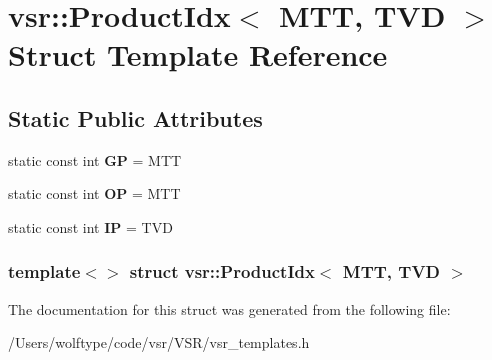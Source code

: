 \hypertarget{structvsr_1_1_product_idx_3_01_m_t_t_00_01_t_v_d_01_4}{\section{vsr\-:\-:Product\-Idx$<$ M\-T\-T, T\-V\-D $>$ Struct Template Reference}
\label{structvsr_1_1_product_idx_3_01_m_t_t_00_01_t_v_d_01_4}
}
\subsection*{Static Public Attributes}
\begin{DoxyCompactItemize}
\item 
\hypertarget{structvsr_1_1_product_idx_3_01_m_t_t_00_01_t_v_d_01_4_af16777eadacdc41477fe3db12b7c80a8}{static const int {\bfseries G\-P} = M\-T\-T}\label{structvsr_1_1_product_idx_3_01_m_t_t_00_01_t_v_d_01_4_af16777eadacdc41477fe3db12b7c80a8}

\item 
\hypertarget{structvsr_1_1_product_idx_3_01_m_t_t_00_01_t_v_d_01_4_a8c6edd445468ea415e7f46837b878c74}{static const int {\bfseries O\-P} = M\-T\-T}\label{structvsr_1_1_product_idx_3_01_m_t_t_00_01_t_v_d_01_4_a8c6edd445468ea415e7f46837b878c74}

\item 
\hypertarget{structvsr_1_1_product_idx_3_01_m_t_t_00_01_t_v_d_01_4_afd7faa889e3acbf1b2fb7d3891f9b1d6}{static const int {\bfseries I\-P} = T\-V\-D}\label{structvsr_1_1_product_idx_3_01_m_t_t_00_01_t_v_d_01_4_afd7faa889e3acbf1b2fb7d3891f9b1d6}

\end{DoxyCompactItemize}
\subsubsection*{template$<$$>$ struct vsr\-::\-Product\-Idx$<$ M\-T\-T, T\-V\-D $>$}



The documentation for this struct was generated from the following file\-:\begin{DoxyCompactItemize}
\item 
/\-Users/wolftype/code/vsr/\-V\-S\-R/vsr\-\_\-templates.\-h\end{DoxyCompactItemize}
